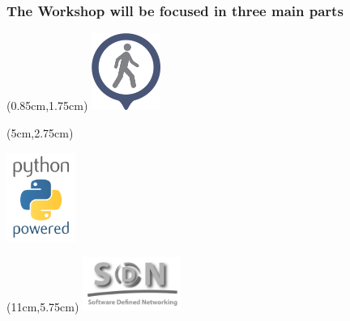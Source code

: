 \documentclass{beamer}
\begin{document}
\begin{frame}
  \frametitle{The Workshop will be focused in three main parts}

  \begin{textblock*}{2.5cm} (0.85cm,1.75cm) %
    \captionsetup{justification=centering}
    \includegraphics[width=2.25cm]{./images/walkthrough.png} %
  \end{textblock*}

  \begin{textblock*}{5cm} (5cm,2.75cm) %
    \begin{center}
    \includegraphics[width=2.25cm]{images/python.png}
    \end{center}
  \end{textblock*}

  \begin{textblock*}{3.2cm} (11cm,5.75cm) %
    \includegraphics[width=3.2cm]{images/sdn-gray.png}
  \end{textblock*}

\end{frame}
\end{document}
